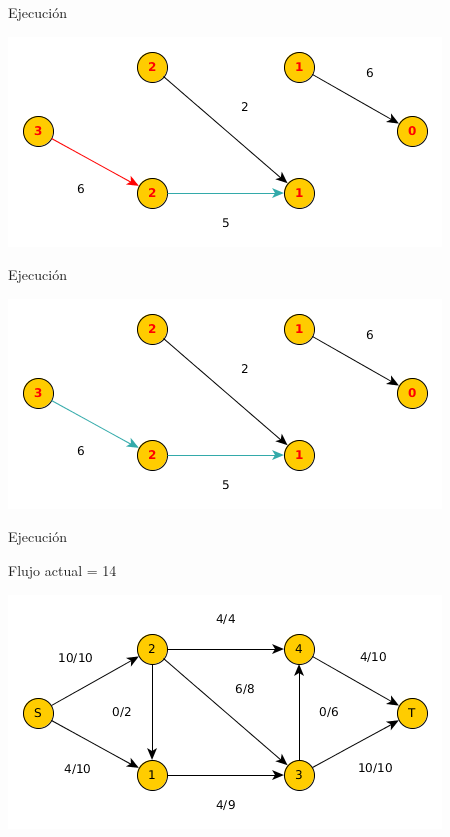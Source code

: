 \documentclass{beamer}
\begin{document}
\begin{frame}{Ejecución}

    
    \includegraphics[scale=0.6]{dinitz/dinitz15.png}
    
\end{frame}

\begin{frame}{Ejecución}

    \includegraphics[scale=0.6]{dinitz/dinitz16.png}
    
\end{frame}

\begin{frame}{Ejecución}

    Flujo actual = 14
    
    \includegraphics[scale=0.6]{dinitz/dinitz17.png}
    
\end{frame}
\end{document}
